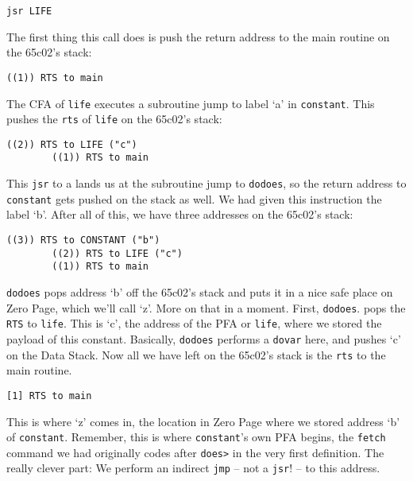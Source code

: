 \begin{enumerate}
{{\begin{lstlisting}[frame=single]
        jsr LIFE
\end{lstlisting}

The first thing this call does is push the return address to the main routine
on the 65c02's stack: 

\begin{lstlisting}[frame=single]
        ((1)) RTS to main
\end{lstlisting}

The CFA of \texttt{life} executes a subroutine jump to label `a' in
\texttt{constant}. This pushes the \texttt{rts} of \texttt{life} on the 65c02's
stack:

\begin{lstlisting}[frame=single]
        ((2)) RTS to LIFE ("c")
        ((1)) RTS to main
\end{lstlisting}

This \texttt{jsr} to a lands us at the subroutine jump to \texttt{dodoes}, so
the return address to \texttt{constant} gets pushed on the stack as well. We had
given this instruction the label `b'. After all of this, we have three addresses
on the 65c02's stack: 

\begin{lstlisting}[frame=single]
        ((3)) RTS to CONSTANT ("b") 
        ((2)) RTS to LIFE ("c") 
        ((1)) RTS to main
\end{lstlisting}

\texttt{dodoes} pops address `b' off the 65c02's stack and puts it in a nice
safe place on Zero Page, which we'll call `z'. More on that in a moment. First,
\texttt{dodoes}.  pops the \texttt{RTS} to \texttt{life}. This is `c', the
address of the PFA or \texttt{life}, where we stored the payload of this
constant. Basically, \texttt{dodoes} performs a \texttt{dovar} here, and
pushes `c' on the Data Stack. Now all we have left on the 65c02's stack is the
\texttt{rts} to the main routine.  
 
\begin{lstlisting}[frame=single]
        [1] RTS to main
\end{lstlisting}

This is where `z' comes in, the location in Zero Page where we stored address
`b' of \texttt{constant}. Remember, this is where \texttt{constant}'s own PFA
begins, the \texttt{fetch} command we had originally codes after \texttt{does>}
in the very first definition. The really clever part: We perform an indirect
\texttt{jmp} -- not a \texttt{jsr}! -- to this address.

}}
\end{enumerate}
